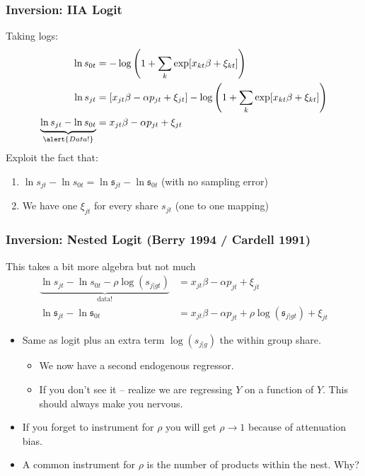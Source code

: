 \begin{frame}
\frametitle{Inversion: IIA Logit}
Taking logs:
\begin{align*}
\ln s_{0t} &= -\log \left(1+\sum_k \exp[x_{kt} \beta + \xi_{kt}] \right) \\
\ln s_{jt} &= [x_{jt} \beta - \alpha p_{jt} +  \xi_{jt} ] - \log \left(1+\sum_k \exp[x_{kt} \beta + \xi_{kt}] \right)\\
\underbrace{\ln s_{jt}- \ln s_{0t}}_{\alert{Data!}} &= x_{jt} \beta -\alpha p_{jt} +  \xi_{jt}
\end{align*}
Exploit the fact that: 
\begin{enumerate}
\item $\ln s_{jt}- \ln s_{0t}= \ln \mathfrak{s}_{jt}- \ln \mathfrak{s}_{0t}$  (with no sampling error)
\item We have one $\xi_{jt}$ for every share $s_{jt}$ (one to one mapping)
\end{enumerate}
\end{frame}



\begin{frame}
\frametitle{Inversion: Nested Logit (Berry 1994 / Cardell 1991)}
This takes a bit more algebra but not much
\begin{align*}
\underbrace{\ln s_{jt}- \ln s_{0t}  - \rho \log(s_{j|gt}) }_{\text{data!}}&= x_{jt} \beta -\alpha p_{jt} +  \xi_{jt} \\
\ln \mathfrak{s}_{jt}- \ln \mathfrak{s}_{0t} &= x_{jt} \beta -\alpha p_{jt} +  \rho \log(\mathfrak{s}_{j|gt})  +  \xi_{jt}
\end{align*}
 \begin{itemize}
\item Same as logit plus an extra term $\log(s_{j|g})$ the \alert{within group share}.
\begin{itemize}
\item We now have a second endogenous regressor.
\item If you don't see it -- realize we are regressing $Y$ on a function of $Y$. This should always make you nervous.
 \end{itemize}
\item If you forget to instrument for $\rho$ you will get $\rho \rightarrow 1$ because of \alert{attenuation bias}.
\item A common instrument for $\rho$ is the number of products within the nest. Why?
 \end{itemize}
\end{frame}

